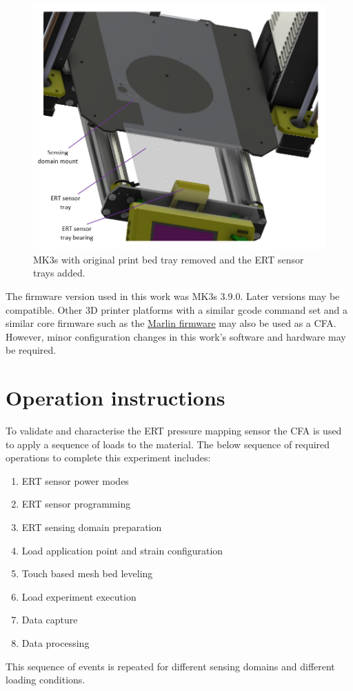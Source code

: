 \begin{figure}[H]
	\centering
	\includegraphics[width=0.6\linewidth]{Figures/cfa_trays_assm_labelled.png}
	\caption{MK3s with original print bed tray removed and the ERT sensor trays added.}
	\label{fig:mk3s_new_trays}
\end{figure}

The firmware version used in this work was MK3s 3.9.0. Later versions may be compatible. Other 3D printer platforms with a similar gcode command set and a similar core firmware such as the \href{https://marlinfw.org/}{Marlin firmware} may also be used as a CFA. However, minor configuration changes in this work's software and hardware may be required.

\section{Operation instructions}
To validate and characterise the ERT pressure mapping sensor the CFA is used to apply a sequence of loads to the material. The below sequence of required operations to complete this experiment includes: 
\begin{enumerate}
	\item ERT sensor power modes
	\item ERT sensor programming
	\item ERT sensing domain preparation
	\item Load application point and strain configuration
	\item Touch based mesh bed leveling
	\item Load experiment execution
	\item Data capture
	\item Data processing
\end{enumerate}
This sequence of events is repeated for different sensing domains and different loading conditions.


